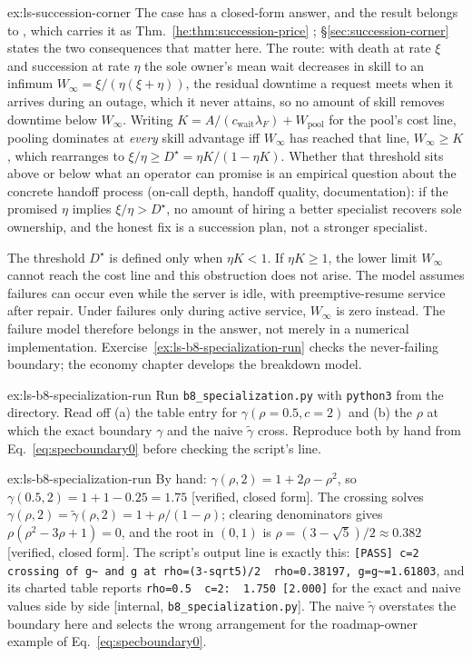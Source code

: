 \documentclass[11pt,a4paper]{article}
\theoremstyle{definition}
\theoremstyle{plain}
\begin{document}
\begin{pdsolution}{ex:ls-succession-corner}
The case has a closed-form answer, and the result belongs to
%
\ifpdbook
, which carries it as Thm.~\ref{he:thm:succession-price}%
\fi
; \S\ref{sec:succession-corner} states the two consequences that matter here.
The route: with death at rate $\xi$ and succession at rate $\eta$ the sole
owner's mean wait decreases in skill to an infimum
$W_\infty=\xi/(\eta(\xi+\eta))$, the residual downtime a request meets when it
arrives during an outage, which it never attains, so no amount of skill removes
downtime below $W_\infty$. Writing $K=A/(c_{\mathrm{wait}}\lambda_F)+W_{\mathrm{pool}}$ for the
pool's cost line, pooling dominates at \emph{every} skill advantage iff $W_\infty$
has reached that line, $W_\infty\ge K$, which rearranges to
$\xi/\eta\ge D^\star=\eta K/(1-\eta K)$. Whether that threshold sits above or
below what an operator can promise is an empirical question about the concrete
handoff process (on-call depth, handoff quality, documentation): if the
promised $\eta$ implies $\xi/\eta>D^\star$, no amount of hiring a better
specialist recovers sole ownership, and the honest fix is a succession plan,
not a stronger specialist.

The threshold $D^\star$ is defined only when $\eta K<1$. If $\eta K\ge1$, the lower limit $W_\infty$ cannot reach the cost line and this obstruction does not arise. The model assumes failures can occur even while the server is idle, with preemptive-resume service after repair. Under failures only during active service, $W_\infty$ is zero instead. The failure model therefore belongs in the answer, not merely in a numerical implementation. Exercise~\ref{ex:ls-b8-specialization-run} checks the never-failing boundary; the economy chapter develops the breakdown model.
\end{pdsolution}
\begin{pdexercise}[kind=Trace,rating=2]{ex:ls-b8-specialization-run}
Run \texttt{b8\_specialization.py} with \texttt{python3} from the
 directory. Read off
(a) the table entry for $\gamma(\rho{=}0.5,c{=}2)$ and (b) the $\rho$ at which the exact
boundary $\gamma$ and the naive $\tilde\gamma$ cross. Reproduce both by hand from
Eq.~\ref{eq:specboundary0} before checking the script's line.
\end{pdexercise}
\begin{pdsolution}{ex:ls-b8-specialization-run}
By hand: $\gamma(\rho,2)=1+2\rho-\rho^2$, so $\gamma(0.5,2)=1+1-0.25=1.75$ [verified, closed form]. The crossing solves $\gamma(\rho,2)=\tilde\gamma(\rho,2)=1+\rho/(1-\rho)$; clearing denominators gives $\rho(\rho^2-3\rho+1)=0$, and the root in $(0,1)$ is $\rho=(3-\sqrt5)/2\approx0.382$ [verified, closed form]. The script's output line is exactly this: \texttt{[PASS] c=2 crossing of g\textasciitilde{} and g at rho=(3-sqrt5)/2\ \ rho=0.38197, g=g\textasciitilde{}=1.61803}, and its charted table reports \texttt{rho=0.5\ \ c=2:\ \ 1.750\ [2.000]} for the exact and naive values side by side [internal, \texttt{b8\_specialization.py}]. The naive $\tilde\gamma$ overstates the boundary here and selects the wrong arrangement for the roadmap-owner example of Eq.~\ref{eq:specboundary0}.
\end{pdsolution}
\end{document}
